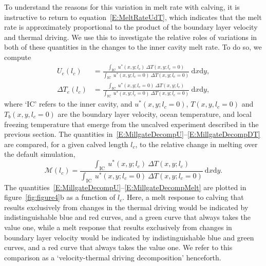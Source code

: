 \documentclass[draft]{agujournal2019}
\begin{document}
To understand the reasons for this variation in melt rate with calving, it is instructive to return to equation~\eqref{E:MeltRateUdT}, which indicates that the melt rate is approximately proportional to the product of the boundary layer velocity and thermal driving. We use this to investigate the relative roles of variations in both of these quantities in the changes to the inner cavity melt rate. To do so, we compute~\cite{Millgate2013JGROceans}
 \begin{align}
U_{e}(l_c) &=  \frac{\int_{\text{IC}}~u^*(x,y; l_c)~\Delta T(x,y;l_c = 0)}{\int_{\text{IC}}~ u^*(x,y; l_c = 0)~\Delta T(x,y;l_c = 0)}~\mathrm{d}x\mathrm{d}y, \label{E:MillgateDecompU}\\ \Delta T_{e}(l_c) &=  \frac{\int_{\text{IC}}~u^*(x,y; l_c=0)~\Delta T(x,y;l_c)}{\int_{\text{IC}}~ u^*(x,y; l_c = 0)~\Delta T(x,y;l_c = 0)}~\mathrm{d}x\mathrm{d}y, \label{E:MillgateDecompDT}
 \end{align}
where `IC' refers to the inner cavity, and $u^*(x,y;l_c = 0)$, $T(x,y,l_c = 0)$ and $T_b(x,y,l_c = 0)$ are the boundary layer velocity, ocean temperature, and local freezing temperature that emerge from the uncalved experiment described in the previous section. The quantities in~\eqref{E:MillgateDecompU}--\eqref{E:MillgateDecompDT} are compared, for a given calved length $l_c$, to the relative change in melting over the default simulation,
 \begin{equation}\label{E:MillgateDecompMelt}
   \mathcal{M}(l_c) =  \frac{\int_{\text{IC}}~u^*(x,y; l_c)~\Delta T(x,y;l_c)}{\int_{\text{IC}}~ u^*(x,y; l_c = 0)~\Delta T(x,y;l_c = 0)}~\mathrm{d}x\mathrm{d}y.
 \end{equation}
The quantities~\eqref{E:MillgateDecompU}--\eqref{E:MillgateDecompMelt} are plotted in figure~\ref{fig:figure4}b as a function of $l_c$.  Here, a melt response to calving that results exclusively from changes in the thermal driving would be indicated by indistinguishable blue and red curves, and a green curve that always takes the value one, while a melt response that results exclusively from changes in boundary layer velocity would be indicated by indistinguishable blue and green curves, and a red curve that always takes the value one. We refer to this comparison as a `velocity-thermal driving decomposition' henceforth. %
\end{document}
